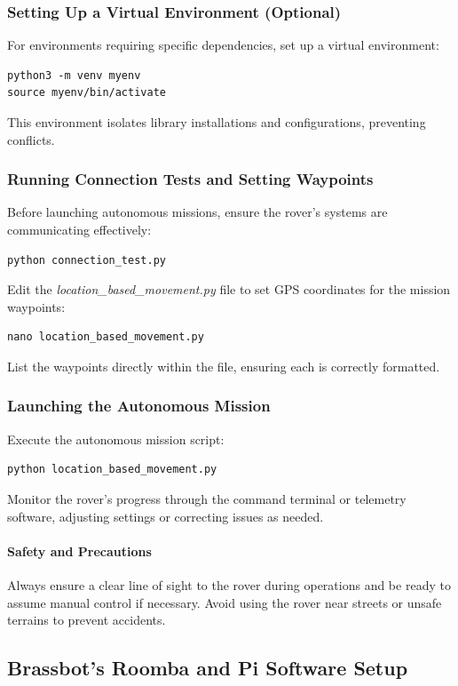 \documentclass{scrarticle}
\begin{document}
\subsubsection{Setting Up a Virtual Environment (Optional)}
For environments requiring specific dependencies, set up a virtual environment:
\begin{verbatim}
python3 -m venv myenv
source myenv/bin/activate
\end{verbatim}
This environment isolates library installations and configurations, preventing conflicts.

\subsubsection{Running Connection Tests and Setting Waypoints}
Before launching autonomous missions, ensure the rover's systems are communicating effectively:
\begin{verbatim}
python connection_test.py
\end{verbatim}
Edit the \textit{location\_based\_movement.py} file to set GPS coordinates for the mission waypoints:
\begin{verbatim}
nano location_based_movement.py
\end{verbatim}
List the waypoints directly within the file, ensuring each is correctly formatted.

\subsubsection{Launching the Autonomous Mission}
Execute the autonomous mission script:
\begin{verbatim}
python location_based_movement.py
\end{verbatim}
Monitor the rover's progress through the command terminal or telemetry software, adjusting settings or correcting issues as needed.

\paragraph{Safety and Precautions}
Always ensure a clear line of sight to the rover during operations and be ready to assume manual control if necessary. Avoid using the rover near streets or unsafe terrains to prevent accidents.


\subsection{Brassbot's Roomba and Pi Software Setup}
\end{document}
